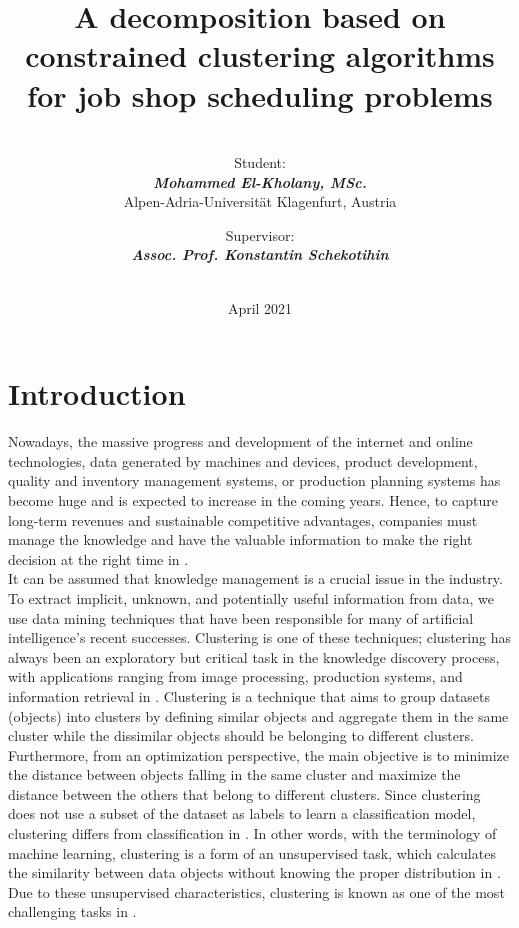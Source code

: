 \documentclass{article}
\title{\textbf{A decomposition based on constrained clustering algorithms for job shop scheduling problems} \\}
\author{\\[1in] Student: \\ \textit{\textbf{Mohammed El-Kholany, MSc.}}\\Alpen-Adria-Universität Klagenfurt, Austria \\[1in] \and Supervisor:\\ \textit{\textbf{Assoc. Prof. Konstantin Schekotihin}} \\  \\[1in]}
\date{April 2021}
\begin{document}
\clearpage\maketitle
\thispagestyle{empty}
\clearpage
\setcounter{page}{1}
\newpage
\section{Introduction}
Nowadays, the massive progress and development of the internet and online technologies, data generated by machines and devices, product development, quality and inventory management systems, or production planning systems has become huge and is expected to increase in the coming years. Hence, to capture long-term revenues and sustainable competitive advantages, companies must manage the knowledge and have the valuable information to make the right decision at the right time in \cite{benabdellah2019survey}. \\

It can be assumed that knowledge management is a crucial issue in the industry. To extract implicit, unknown, and potentially useful information from data, we use data mining techniques that have been responsible for many of artificial intelligence’s recent successes. Clustering is one of these techniques; clustering has always been an exploratory but critical task in the knowledge discovery process, with applications ranging from image processing, production systems, and information retrieval in \cite{benabdellah2019survey}. Clustering is a technique that aims to group datasets (objects) into clusters by defining similar objects and aggregate them in the same cluster while the dissimilar objects should be belonging to different clusters. \\

Furthermore, from an optimization perspective, the main objective is to minimize the distance between objects falling in the same cluster and maximize the distance between the others that belong to different clusters. Since clustering does not use a subset of the dataset as labels to learn a classification model, clustering differs from classification in \cite{wagstaff2001constrained}. In other words, with the terminology of machine learning, clustering is a form of an unsupervised task, which calculates the similarity between data objects without knowing the proper distribution in \cite{li2018geometric}. Due to these unsupervised characteristics, clustering is known as one of the most challenging tasks in \cite{benabdellah2019survey}. \\
\end{document}
